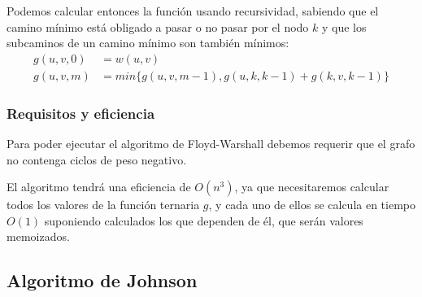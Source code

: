 \documentclass[a4paper, 11pt]{article} %
\begin{document}
    Podemos calcular entonces la función usando recursividad, sabiendo que el
    camino mínimo está obligado a pasar o no pasar por el nodo $k$ y que los
    subcaminos de un camino mínimo son también mínimos:
    \begin{equation}
      \begin{split}
      g(u,v,0) &= w(u,v) \\
      g(u,v,m) &= min\{g(u,v,m-1), g(u,k,k-1)+g(k,v,k-1)\}
      \end{split}
    \end{equation}
    
    \subsubsection{Requisitos y eficiencia}
      Para poder ejecutar el algoritmo de Floyd-Warshall debemos requerir que el grafo
      no contenga ciclos de peso negativo.
      
      El algoritmo tendrá una eficiencia de $O(n^3)$, ya que necesitaremos calcular
      todos los valores de la función ternaria $g$, y cada uno de ellos se calcula
      en tiempo $O(1)$ suponiendo calculados los que dependen de él, que serán valores
      memoizados.
  
  \subsection{Algoritmo de Johnson}
\end{document}
